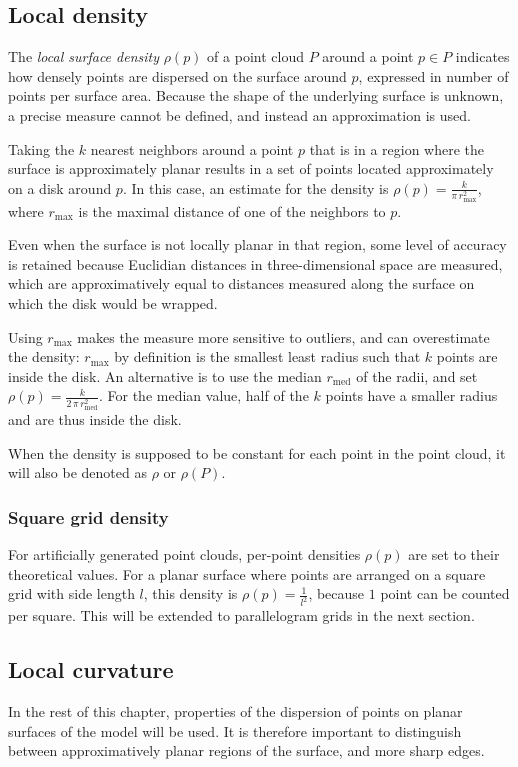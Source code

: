 \subsection{Local density}
The \emph{local surface density} $\rho(p)$ of a point cloud $P$ around a point $p \in P$ indicates how densely points are dispersed on the surface around $p$, expressed in number of points per surface area. Because the shape of the underlying surface is unknown, a precise measure cannot be defined, and instead an approximation is used.

Taking the $k$ nearest neighbors around a point $p$ that is in a region where the surface is approximately planar results in a set of points located approximately on a disk around $p$. In this case, an estimate for the density is $\rho(p) = \frac{k}{\pi \, r_{\text{max}}^2}$, where $r_{\text{max}}$ is the maximal distance of one of the neighbors to $p$.

Even when the surface is not locally planar in that region, some level of accuracy is retained because Euclidian distances in three-dimensional space are measured, which are approximatively equal to distances measured along the surface on which the disk would be wrapped.

Using $r_{\text{max}}$ makes the measure more sensitive to outliers, and can overestimate the density: $r_{\text{max}}$ by definition is the smallest least radius such that $k$ points are inside the disk. An alternative is to use the median $r_{\text{med}}$ of the radii, and set $\rho(p) = \frac{k}{2 \, \pi \, r_{\text{med}}^2}$. For the median value, half of the $k$ points have a smaller radius and are thus inside the disk.

When the density is supposed to be constant for each point in the point cloud, it will also be denoted as $\rho$ or $\rho(P)$.

\subsubsection{Square grid density}
For artificially generated point clouds, per-point densities $\rho(p)$ are set to their theoretical values. For a planar surface where points are arranged on a square grid with side length $l$, this density is $\rho(p) = \frac{1}{l^2}$, because $1$ point can be counted per square. This will be extended to parallelogram grids in the next section.


\subsection{Local curvature} \label{sec:curvature}
In the rest of this chapter, properties of the dispersion of points on planar surfaces of the model will be used. It is therefore important to distinguish between approximatively planar regions of the surface, and more sharp edges.

